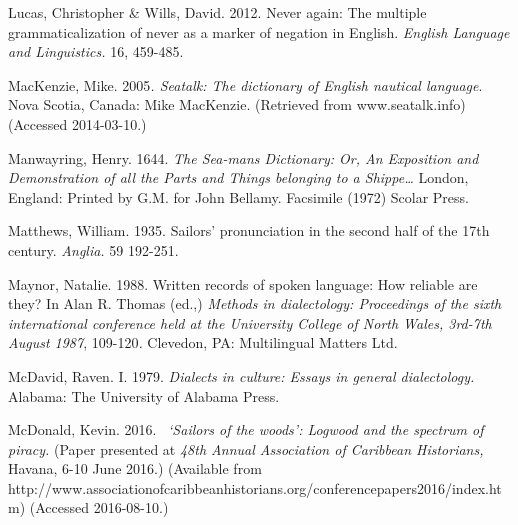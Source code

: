 \begin{styleStandard}
Lucas, Christopher \& Wills, David. 2012. Never again: The multiple grammaticalization of never as a marker of negation in English. \textit{English Language and Linguistics.} 16, 459-485.
\end{styleStandard}

\begin{styleStandard}
MacKenzie, Mike.\textit{ }2005\textit{. Seatalk: The dictionary of English nautical language}. Nova Scotia, Canada: Mike MacKenzie. (Retrieved from www.seatalk.info) (Accessed 2014-03-10.)
\end{styleStandard}

\begin{styleStandard}
Manwayring, Henry. 1644.\textit{ The Sea-mans Dictionary: Or, An Exposition and Demonstration of all the Parts and Things belonging to a Shippe…} London, England: Printed by G.M. for John Bellamy. Facsimile (1972) Scolar Press. 
\end{styleStandard}

\begin{styleStandard}
Matthews, William. 1935. Sailors’ pronunciation in the second half of the 17th century. \textit{Anglia. }59 192-251.
\end{styleStandard}

\begin{styleStandard}
Maynor, Natalie. 1988. Written records of spoken language: How reliable are they? In Alan R. Thomas (ed.,) \textit{Methods in dialectology: Proceedings of the sixth international conference held at the University College of North Wales, 3rd-7th August 1987}, 109-120\textit{.} Clevedon, PA: Multilingual Matters Ltd.
\end{styleStandard}

\begin{styleStandard}
McDavid, Raven. I. 1979. \textit{Dialects in culture: Essays in general dialectology.} Alabama: The University of Alabama Press. 
\end{styleStandard}

\begin{styleStandard}
McDonald, Kevin. 2016. \ \textit{‘Sailors of the woods’: Logwood and the spectrum of piracy. }(Paper presented at \textit{48th Annual Association of Caribbean Historians,} Havana, 6-10 June 2016.) (Available from http://www.associationofcaribbeanhistorians.org/conferencepapers2016/index.htm) (Accessed 2016-08-10.)
\end{styleStandard}

